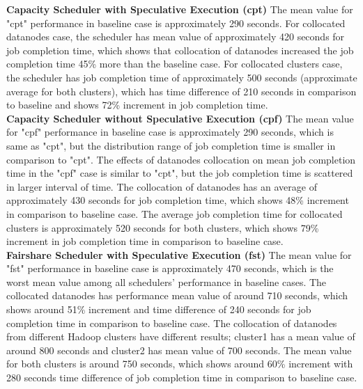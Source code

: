 \textbf{Capacity Scheduler with Speculative Execution (cpt)} The mean value for "cpt" performance in baseline case is approximately 290 seconds. For collocated datanodes case, the scheduler has mean value of approximately 420 seconds for job completion time, which shows that collocation of datanodes increased the job completion time 45\% more than the baseline case. For collocated clusters case, the scheduler has job completion time of approximately 500 seconds (approximate average for both clusters), which has time difference of 210 seconds in comparison to baseline and shows 72\% increment in job completion time.\\

\textbf{Capacity Scheduler without Speculative Execution (cpf)} The mean value for "cpf" performance  in baseline case is approximately 290 seconds, which is same as "cpt", but the distribution range of job completion time is smaller in comparison to "cpt". The effects of datanodes collocation on mean job completion time in the "cpf" case is similar to "cpt", but the job completion time is scattered in larger interval of time. The collocation of datanodes has an average of approximately 430 seconds for job completion time, which shows 48\% increment in comparison to baseline case. The average job completion time for collocated clusters is approximately 520 seconds for both clusters, which shows 79\% increment in job completion time in comparison to baseline case. \\ 


\textbf{Fairshare Scheduler with Speculative Execution (fst)} The mean value for "fst" performance in  baseline case is approximately 470 seconds, which is the worst mean value among all schedulers' performance in baseline cases. The collocated datanodes has performance mean value of around 710 seconds, which shows around 51\% increment and time difference of 240 seconds for job completion time in comparison to baseline case. The collocation of datanodes from different Hadoop clusters have different results; cluster1 has a mean value of around 800 seconds and cluster2 has mean value of 700 seconds. The mean value for both clusters is around 750 seconds,  which shows around 60\% increment with 280 seconds time difference of job completion time in comparison to baseline case.\\

